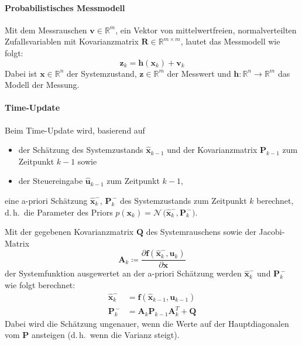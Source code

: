 \documentclass[a4paper, 11pt, accentcolor = tud3b]{tudreport}
\newcommand{\R}{\mathbb{R}}
\newcommand{\mat}[1]{\boldsymbol{#1}}
\renewcommand{\vec}[1]{\boldsymbol{\mathbf{#1}}}
\renewcommand{\dh}{d.\,h.~}
\begin{document}
					\paragraph{Probabilistisches Messmodell}
						Mit dem Messrauschen \( \vec{v} \in \R^m \), ein Vektor von mittelwertfreien, normalverteilten Zufallsvariablen mit Kovarianzmatrix \( \mat{R} \in \R^{m \times m} \), lautet das Messmodell wie folgt:
						\begin{equation*}
							\vec{z}_k = \vec{h}(\vec{x}_k) + \vec{v}_k
						\end{equation*}
						Dabei ist \( \vec{x} \in \R^n \) der Systemzustand, \( \vec{z} \in \R^m \) der Messwert und \( \vec{h} : \R^n \to \R^m \) das Modell der Messung.

					\paragraph{Time-Update}
						Beim Time-Update wird, basierend auf
						\begin{itemize}
							\item der Schätzung des Systemzustands \( \hat{\vec{x}}_{k - 1} \) und der Kovarianzmatrix \( \mat{P}_{k - 1} \) zum Zeitpunkt \( k - 1 \) sowie
							\item der Steuereingabe \( \hat{\vec{u}}_{k - 1} \) zum Zeitpunkt \( k - 1 \),
						\end{itemize}
						eine a-priori Schätzung \( \hat{\vec{x}}_k^- \), \( \mat{P}_k^{\,-} \) des Systemzustands zum Zeitpunkt \(k\) berechnet, \dh die Parameter des Priors \( p(\vec{x}_k) = \mathcal{N}\,\big(\hat{\vec{x}}_k^-, \mat{P}_k^{\,-}\big) \).
						
						Mit der gegebenen Kovarianzmatrix \( \mat{Q} \) des Systemrauschens sowie der Jacobi-Matrix
						\begin{equation*}
							\mat{A}_k \coloneqq \frac{\partial \vec{f}(\hat{\vec{x}}_k^-, \vec{u}_k)}{\partial \vec{x}}
						\end{equation*}
						der Systemfunktion ausgewertet an der a-priori Schätzung werden \( \hat{\vec{x}}_k^- \) und \( \mat{P}_k^{\,-} \) wie folgt berechnet:
						\begin{align*}
							\hat{\vec{x}}_k^- & = \vec{f}(\hat{\vec{x}}_{k - 1}, \vec{u}_{k - 1}) \\
							\mat{P}_k^{\,-}       & = \mat{A}_k \mat{P}_{k - 1} \mat{A}_k^T + \mat{Q}
						\end{align*}
						Dabei wird die Schätzung ungenauer, wenn die Werte auf der Hauptdiagonalen vom \( \mat{P} \) ansteigen (\dh wenn die Varianz steigt).
\end{document}
